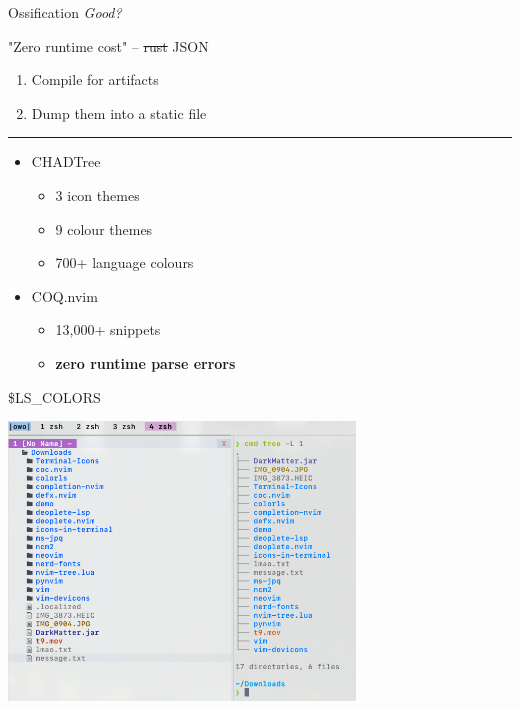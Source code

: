 \documentclass{beamer}
\begin{document}
\begin{frame}{Ossification \textit{Good?}}

	"Zero runtime cost" -- \st{rust} JSON

	\begin{enumerate}

		\item Compile  for artifacts

		\item Dump them into a static file

	\end{enumerate}

	\rule{\textwidth}{0.1em}

	\begin{itemize}

		\item CHADTree

		      \begin{itemize}

			      \item 3 icon themes

			      \item 9 colour themes

			      \item 700+ language colours

		      \end{itemize}

		\item COQ.nvim

		      \begin{itemize}

			      \item 13,000+ snippets

			      \item \textbf{zero runtime parse errors}

		      \end{itemize}

	\end{itemize}

\end{frame}


\begin{frame}{\$LS\_COLORS}

	\includegraphics[width=\textwidth,height=20em]{chadtree_ls}

\end{frame}
\end{document}

